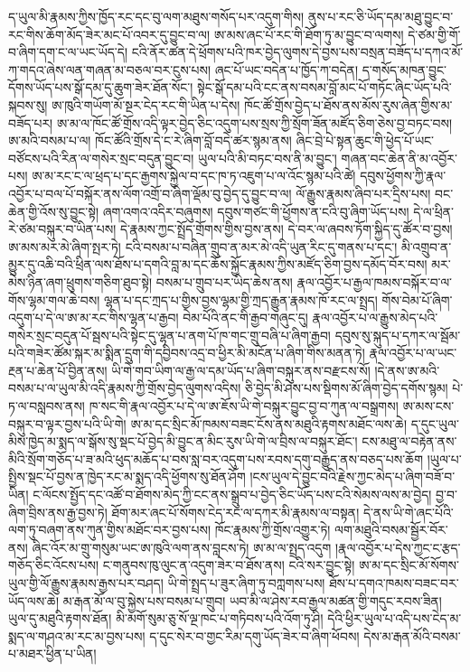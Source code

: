 \documentclass{article}
\begin{document}
ད་ཡུལ་མི་རྣམས་ཀྱིས་ཁྱོད་རང་དང་བུ་ལག་མཐུས་གསོད་པར་འདུག་གིས། ནུས་པ་རང་ཅི་ཡོད་དམ་མཐུ་བྱུང་བ་རང་གིས་ཆོག་མོད་ཟེར་མང་པོ་འབར་དུ་བྱུང་བ་ལ། ཨ་མས་ཞང་པོ་རང་གི་ཐོག་ཏུ་མ་བྱུང་བ་ལགས། དེ་ཙམ་གྱི་གོ་བ་ཞིག་དག་ང་ལ་ཡང་ཡོད་དེ། ངའི་ནོར་ཚན་དེ་ཕྲོགས་པའི་ཁར་བྱེད་ལུགས་དེ་བྱས་པས་བསྲན་བཟོད་པ་དཀའ་མོ་ཀ་གདའ་ཞེས་ལན་གཞན་མ་བཅལ་བར་ངུས་པས། ཞང་པོ་ཡང་བདེན་པ་ཁྱོད་ཀ་བདེན། ད་གསོད་མཁན་བྱུང་དོགས་ཡོད་པས་སྒོ་དམ་དུ་ཆུག་ཟེར་ཐོན་སོང་། སྟེང་སྒོ་དམ་པའི་ངང་ནས་བསམ་བློ་མང་པོ་གཏོང་ཞིང་ཡོད་པའི་སྐབས་སུ། ཨ་ཁུའི་གཡོག་མོ་སྔར་ངེད་རང་གི་ཡིན་པ་དེས། ཁོང་ཚོ་གྲོས་བྱེད་པ་ཐོས་ནས་མོས་རུས་ཞེན་གྱིས་མ་བཟོད་པར། ཨ་མ་ལ་ཁོང་ཚོ་གྲོས་འདི་ལྟར་བྱེད་ཅིང་འདུག་པས་སྲས་ཀྱི་སྲོག་ཟོན་མཛོད་ཅིག་ཅེས་བྱ་བཏང་བས། ཨ་མའི་བསམ་པ་ལ། ཁོང་ཚོའི་གྲོས་དེ་ང་རེ་ཞིག་བློ་བདེ་ཚར་སྙམ་ནས། ཞིང་བྲེ་པེ་སྟན་ཆུང་གི་ཕྱེད་པོ་ཡང་བཙོངས་པའི་རིན་ལ་གསེར་སྲང་བདུན་བྱུང་བ། ཡུལ་པའི་མི་བཏང་བས་ནི་མ་བྱུང་། གཞན་བང་ཆེན་ནི་མ་འབྱོར་པས། ཨ་མ་རང་ང་ལ་ཕྲད་པ་དང་རྒྱགས་སྐྱེལ་བ་དང་ཁ་ཏ་འཇུག་པ་ལ་འོང་སྙམ་པའི་ཚེ། དབུས་ཕྱོགས་ཀྱི་རྣལ་འབྱོར་པ་བལ་པོ་བསྐོར་ནས་ལོག་འགྲོ་བ་ཞིག་ལྡོམ་བུ་བྱེད་དུ་བྱུང་བ་ལ། ལོ་རྒྱུས་རྣམས་ཞིབ་པར་དྲིས་པས། བང་ཆེན་གྱི་འོས་སུ་བྱུང་སྟེ། ཞག་འགའ་འདིར་བཞུགས། དབུས་གཙང་གི་ཕྱོགས་ན་ངའི་བུ་ཞིག་ཡོད་པས། དེ་ལ་ཕྲིན་རེ་ཙམ་བསྐུར་བ་ཡིན་པས། དེ་རྣམས་ཀྱང་སྤྲོད་གྲོགས་གྱིས་བྱས་ནས། དེ་བར་ལ་ཞབས་ཏོག་སྐྱིད་དུ་ཚོར་བ་བྱས། ཨ་མས་མར་མེ་ཞིག་སྤར་ཏེ། ངའི་བསམ་པ་བཞིན་གྲུབ་ན་མར་མེ་འདི་ཡུན་རིང་དུ་གནས་པ་དང་། མི་འགྲུབ་ན་མྱུར་དུ་འཆི་བའི་ཕྲིན་ལས་ཐོས་པ་དགའི་བླ་མ་དང་ཆོས་སྐྱོང་རྣམས་ཀྱིས་མཛོད་ཅིག་བྱས་དམོད་བོར་བས། མར་མེས་ཉིན་ཞག་ཕྲུགས་གཅིག་ཐུབ་སྟེ། བསམ་པ་གྲུབ་པར་ཡིད་ཆེས་ནས། རྣལ་འབྱོར་པ་རྒྱལ་ཁམས་བསྐོར་བ་ལ་གོས་ལྷམ་གལ་ཆེ་བས། ལྷན་པ་དང་ཀྲད་པ་གྱིས་བྱས་ལྷམ་གྱི་ཀྲད་རྒྱུན་རྣམས་ཁོ་རང་ལ་སྤྲད། གོས་བེམ་པོ་ཞིག་འདུག་པ་དེ་ལ་ཨ་མ་རང་གིས་ལྷན་པ་རྒྱབ། བེམ་པོའི་ནང་གི་རྒྱབ་གཞུང་དུ། རྣལ་འབྱོར་པ་ལ་རྒྱུས་མེད་པའི་གསེར་སྲང་བདུན་པོ་སྦས་པའི་སྟེང་དུ་ལྷན་པ་ནག་པོ་ཁ་གང་གྲུ་བཞི་པ་ཞིག་རྒྱབ། དབུས་སུ་སྐུད་པ་དཀར་ལ་སྦོམ་པའི་གཟེར་ཚོམ་སྐར་མ་སྨིན་དྲུག་གི་དབྱིབས་འདྲ་བ་ཕྱིར་མི་མངོན་པ་ཞིག་གིས་མནན་ཏེ། རྣལ་འབྱོར་པ་ལ་ཡང་རྔན་པ་ཆེན་པོ་བྱིན་ནས། ཡི་གེ་གབ་ཡིག་ལ་རྒྱ་ལ་དམ་ཡོད་པ་ཞིག་བསྐུར་ནས་བརྫངས་སོ། །དེ་ནས་ཨ་མའི་བསམ་པ་ལ་ཡུལ་མི་འདི་རྣམས་ཀྱི་གྲོས་བྱེད་ལུགས་འདིས། ཅི་བྱེད་མི་ཤེས་པས་སྡིགས་མོ་ཞིག་བྱེད་དགོས་སྙམ། པེ་ཏ་ལ་བསླབས་ནས། ཁ་སང་གི་རྣལ་འབྱོར་པ་དེ་ལ་ཨ་ཇོས་ཡི་གེ་བསྐུར་བྱུང་བྱ་བ་ཀུན་ལ་བསྒྲགས། ཨ་མས་ངས་བསྐུར་བ་ལྟར་བྱས་པའི་ཡི་གེ། ཨ་མ་དང་སྲིང་མོ་ཁམས་བཟང་ངོས་ནས་མཐུའི་རྟགས་མཐོང་ལས་ཆེ། ད་དུང་ཡུལ་མིས་ཁྱེད་མ་སྨད་ལ་སྒོས་སུ་སྡང་པོ་བྱེད་མི་བྱུང་ན་མིང་རུས་ཡི་གེ་ལ་བྲིས་ལ་བསྐུར་ཐོང་། ངས་མཐུ་ལ་བརྟེན་ནས་མིའི་སྲོག་གཅོད་པ་ཟ་མའི་ཕུད་མཆོད་པ་བས་སླ་བར་འདུག་པས་རབས་དགུ་བརྒྱུད་ནས་བཅད་པས་ཆོག །ཡུལ་པ་སྤྱིས་སྡང་པོ་བྱས་ན་ཁྱེད་རང་མ་སྨད་འདི་ཕྱོགས་སུ་ཐོན་ཤོག །ངས་ཡུལ་དེ་བྱུང་བའི་རྗེས་ཀྱང་མེད་པ་ཞིག་བཟོ་བ་ཡིན། ང་ལོངས་སྤྱོད་དང་འཚོ་བ་ཐོགས་མེད་ཀྱི་ངང་ནས་སྒྲུབ་པ་བྱེད་ཅིང་ཡོད་པས་ངའི་སེམས་ལས་མ་བྱེད། བྱ་བ་ཞིག་བྲིས་ནས་རྒྱ་བྱས་ཏེ། ཐོག་མར་ཞང་པོ་སོགས་ངེད་རང་ལ་དཀར་མི་རྣམས་ལ་བསྟན། དེ་ནས་ཡི་གེ་ཞང་པོའི་ལག་ཏུ་བཞག་ནས་ཀུན་གྱིས་མཐོང་བར་བྱས་པས། ཁོང་རྣམས་ཀྱི་གྲོས་འགྱུར་ཏེ། ལག་མཐུའི་བསམ་སྦྱོར་བོར་ནས། ཞིང་འོར་མ་གྲུ་གསུམ་ཡང་ཨ་ཁུའི་ལག་ནས་བླངས་ཏེ། ཨ་མ་ལ་སྤྲད་འདུག །རྣལ་འབྱོར་པ་དེས་ཀྱང་ང་རྩད་གཅོད་ཅིང་འོངས་པས། ང་གནུབས་ཁུ་ལུང་ན་འདུག་ཟེར་བ་ཐོས་ནས། ངའི་སར་བྱུང་སྟེ། ཨ་མ་དང་སྲིང་མོ་སོགས་ཡུལ་གྱི་ལོ་རྒྱུས་རྣམས་རྒྱས་པར་བཤད། ཡི་གེ་སྤྲད་པ་ཟུར་ཞིག་ཏུ་བཀླགས་པས། ཐོས་པ་དགའ་ཁམས་བཟང་བར་ཡོད་ལས་ཆེ། མ་རྒན་མོ་ལ་བུ་སྐྱེས་པས་བསམ་པ་གྲུབ། ཡབ་མི་ལ་ཤེས་རབ་རྒྱལ་མཚན་གྱི་གདུང་རབས་ཟིན། ཡུལ་དུ་མཐུའི་རྟགས་ཐོན། མི་མགོ་སུམ་ཅུ་སོ་ལྔ་ཁང་པ་གཏིབས་པའི་འོག་ཏུ་ཤི། དེའི་ཕྱིར་ཡུལ་པ་འདི་པས་ངེད་མ་སྨད་ལ་གཤའ་མ་རང་མ་བྱས་པས། ད་དུང་སེར་བ་གྱང་རིམ་དགུ་ཡོད་ཟེར་བ་ཞིག་ཕོབས། དེས་མ་རྒན་མོའི་བསམ་པ་མཐར་ཕྱིན་པ་ཡིན། 
\end{document}
